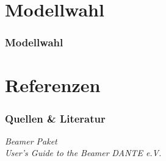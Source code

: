 \documentclass{beamer}
\begin{document}
\section{Modellwahl}
\begin{frame}\frametitle{Modellwahl}

\end{frame}

\section[Quellen]{Referenzen}
\begin{frame}\frametitle{Quellen \& Literatur}

\begin{thebibliography}{9}
 \emph{Beamer Paket} \\ 
 \emph{User's Guide to the Beamer} 
 \emph{DANTE e.V.}    
\end{thebibliography}


\end{frame}
\end{document}

